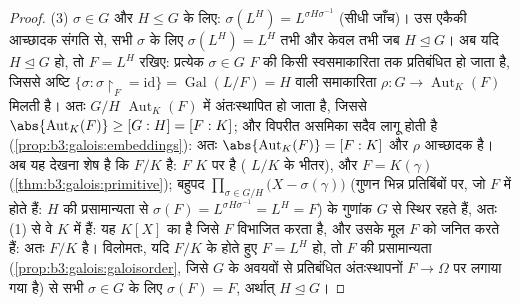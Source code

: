 \begin{proof}
(3) $\sigma \in G$ और $H \leq G$ के लिए: $\sigma(L^H) =
L^{\sigma H\sigma^{-1}}$ (सीधी जाँच)। उस एकैकी आच्छादक
संगति से, सभी $\sigma$ के लिए $\sigma(L^H) = L^H$ तभी और केवल तभी जब $H \trianglelefteq G$। अब
यदि $H \trianglelefteq G$ हो, तो $F = L^H$ रखिए: प्रत्येक $\sigma \in
G$ $F$ की किसी
स्वसमाकारिता तक प्रतिबंधित हो जाता है, जिससे अष्टि $\{\sigma :
\sigma\restriction_F = \mathrm{id}\} = \operatorname{Gal}(L/F) =
H$ वाली
समाकारिता $\rho
\colon G \to \operatorname{Aut}_K(F)$ मिलती है। अतः $G/H$ $\operatorname{Aut}_K(F)$ में अंतःस्थापित हो
जाता है, जिससे $\abs{\operatorname{Aut}_K(F)} \geq [G:H] = [F:K]$; और विपरीत असमिका सदैव लागू होती है
(\cref{prop:b3:galois:embeddings}): अतः $\abs{\operatorname{Aut}_K(F)} = [F:K]$ और $\rho$ आच्छादक है। अब यह देखना शेष है कि
$F/K$  है: $F$ $K$ पर  है ( $L/K$ के
भीतर), और $F = K(\gamma)$ (\cref{thm:b3:galois:primitive}); बहुपद $\prod_{\sigma \in G/H}\bigl(X - \sigma(\gamma)\bigr)$ (गुणन भिन्न प्रतिबिंबों
पर, जो $F$ में होते हैं: $H$ की प्रसामान्यता से $\sigma(F) =
L^{\sigma H\sigma^{-1}} = L^H = F$) के
गुणांक $G$ से स्थिर रहते हैं, अतः (1) से वे $K$ में हैं: यह
$K[X]$ का  है जिसे $F$ विभाजित करता है, और उसके
मूल $F$ को जनित करते हैं: अतः $F/K$  है। विलोमतः, यदि
$F/K$ के  होते हुए $F = L^H$ हो, तो $F$ की प्रसामान्यता
(\cref{prop:b3:galois:galoisorder}, जिसे $G$ के अवयवों से प्रतिबंधित अंतःस्थापनों $F \to \Omega$ पर
लगाया गया है) से सभी $\sigma \in G$ के लिए $\sigma(F) = F$, अर्थात् $H
\trianglelefteq G$।
\end{proof}

